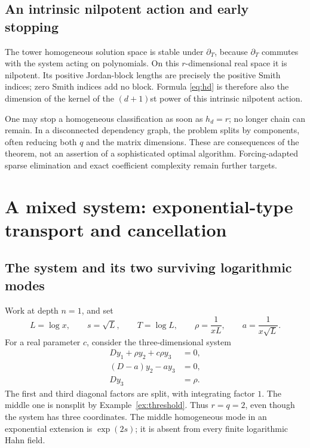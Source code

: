 \documentclass[11pt,a4paper]{article}
\numberwithin{equation}{section}
\theoremstyle{definition}
\theoremstyle{remark}\newtheorem{remark}[theorem]{Remark}
\newcommand{\dd}{\partial_T}\newcommand{\eps}{\varepsilon}
\begin{document}
\subsection{An intrinsic nilpotent action and early stopping}
The tower homogeneous solution space is stable under $\dd$, because $\dd$ commutes with the system acting on polynomials. On this $r$-dimensional real space it is nilpotent. Its positive Jordan-block lengths are precisely the positive Smith indices; zero Smith indices add no block. Formula \eqref{eq:hd} is therefore also the dimension of the kernel of the $(d+1)$st power of this intrinsic nilpotent action.

One may stop a homogeneous classification as soon as $h_d=r$; no longer chain can remain. In a disconnected dependency graph, the problem splits by components, often reducing both $q$ and the matrix dimensions. These are consequences of the theorem, not an assertion of a sophisticated optimal algorithm. Forcing-adapted sparse elimination and exact coefficient complexity remain further targets.

\section{A mixed system: exponential-type transport and cancellation}
\label{sec:example}
\subsection{The system and its two surviving logarithmic modes}
Work at depth $n=1$, and set
\[
 L=\log x,\qquad s=\sqrt L,\qquad T=\log L,
 \qquad \rho=\frac1{xL},\qquad a=\frac1{x\sqrt L}.
\]
For a real parameter $c$, consider the three-dimensional system
\begin{align}
 Dy_1+\rho y_2+c\rho y_3&=0,\label{eq:example1}\\
 (D-a)y_2-a y_3&=0,\label{eq:example2}\\
 Dy_3&=\rho.\label{eq:example3}
\end{align}
The first and third diagonal factors are split, with integrating factor $1$. The middle one is nonsplit by Example~\ref{ex:threshold}. Thus $r=q=2$, even though the system has three coordinates. The middle homogeneous mode in an exponential extension is $\exp(2s)$; it is absent from every finite logarithmic Hahn field.
\end{document}
